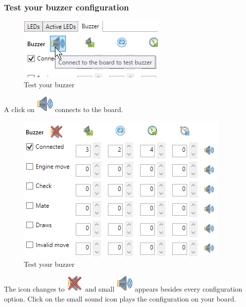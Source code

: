 \documentclass[11pt,a4paper]{article}
\begin{document}
\subsubsection{Test your buzzer configuration}

\begin{figure}[H]
	\centering
	\includegraphics[scale=1.0]{iChessOneBuzzer2.png}
	\caption{Test your buzzer }
	\label{fig:iChessOneBuzzer2}
\end{figure}

A click on \includegraphics[scale=0.4]{sound.png} connects to the board.

\begin{figure}[H]
	\centering
	\includegraphics[scale=1.0]{iChessOneBuzzer3.png}
	\caption{Test your buzzer }
	\label{fig:iChessOneBuzzer3}
\end{figure}
The icon changes to \includegraphics[scale=0.4]{sound_mute.png} and small \includegraphics[scale=0.3]{sound.png} appears besides every configuration option. Click on the small sound icon plays the configuration on your board.
\end{document}
